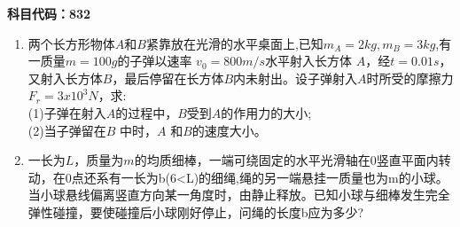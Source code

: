 \textbf{科目代码：832}
\begin{enumerate}
\item 两个长方形物体$A$和$B$紧靠放在光滑的水平桌面上,已知$m_A=2kg,m_B=3kg$,有一质量$ m=100g$的子弹以速率 $v_0=800m/s$水平射入长方体 $A$，经$t=0.01s$，又射入长方体$B$，最后停留在长方体$B$内未射出。设子弹射入$A$时所受的摩擦力$F_r=3x10^3N$，求:\\
(1)子弹在射入$A$的过程中，$B $受到$A$的作用力的大小;\\
(2)当子弹留在$ B$ 中时，$A$ 和$B$的速度大小。
\item 一长为$L$，质量为$m$的均质细棒，一端可绕固定的水平光滑轴在0竖直平面内转动，在0点还系有一长为b(6<L)的细绳,绳的另一端悬挂一质量也为m的小球。当小球悬线偏离竖直方向某一角度时，由静止释放。已知小球与细棒发生完全弹性碰撞，要使碰撞后小球刚好停止，问绳的长度b应为多少?
\end{enumerate}
